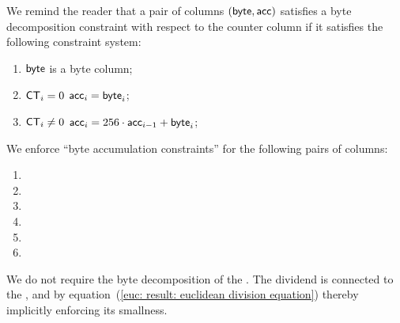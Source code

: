 We remind the reader that a pair of columns $(\textsf{byte}, \textsf{acc})$ satisfies a byte decomposition constraint with respect to the counter column \ct{} if it satisfies the following constraint system: 
\begin{enumerate}
	\item $\textsf{byte}$ is a byte column;
	\item \If $\textsf{CT}_{i} = 0$ \Then $\textsf{acc}_{i} = \textsf{byte}_{i}$;
	\item \If $\textsf{CT}_{i} \neq 0$ \Then $\textsf{acc}_{i} = 256 \cdot \textsf{acc}_{i - 1} + \textsf{byte}_{i}$;
\end{enumerate}
We enforce ``byte accumulation constraints'' for the following pairs of columns:
\begin{multicols}{3}
	\begin{enumerate}
		\item \divisorByte{}
		\item \divisor{}
		\item \quotientByte{}
		\item \quotient{}
		\item \remainderByte{}
		\item \remainder{}
	\end{enumerate}
\end{multicols} 
\saNote{}
We do not require the byte decomposition of the \dividend{}.
The dividend is connected to the \divisor{}, \quotient{} and \remainder{} by equation~(\ref{euc: result: euclidean division equation}) thereby implicitly enforcing its smallness.
